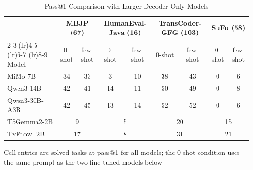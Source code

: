 \documentclass[manuscript,screen]{acmart}
\newcommand{\toolname}[1]{\textsc{#1}}
\newcommand{\mainname}{\toolname{TyFlow}\xspace}
\begin{document}
   \begin{table}[ht]
\centering
\begin{threeparttable}
\caption{{\color{revblue}Pass@1 Comparison with Larger Decoder-Only Models}}
\label{tab:decoder-only-compare}
\begin{tabular}{l cc cc cc cc}
\toprule
& \multicolumn{2}{c}{{\color{revblue}MBJP (67)}} & \multicolumn{2}{c}{{\color{revblue}HumanEval-Java (16)}} & \multicolumn{2}{c}{{\color{revblue}TransCoder-GFG (103)}} & \multicolumn{2}{c}{{\color{revblue}SuFu (58)}} \\
\cmidrule(lr){2-3} \cmidrule(lr){4-5} \cmidrule(lr){6-7} \cmidrule(lr){8-9}
{\color{revblue}Model }& {\color{revblue}0-shot }& {\color{revblue}few-shot }& {\color{revblue}0-shot }& {\color{revblue}few-shot }& {\color{revblue}0-shot }& {\color{revblue}few-shot }& {\color{revblue}0-shot }& {\color{revblue}few-shot }\\
\midrule
{\color{revblue}MiMo-7B             }& {\color{revblue}34 }& {\color{revblue}33 }& {\color{revblue}3  }& {\color{revblue}10 }& {\color{revblue}38 }& {\color{revblue}43 }& {\color{revblue}0 }& {\color{revblue}6 }\\
{\color{revblue}Qwen3-14B           }& {\color{revblue}42 }& {\color{revblue}41 }& {\color{revblue}14 }& {\color{revblue}11 }& {\color{revblue}50 }& {\color{revblue}49 }& {\color{revblue}0 }& {\color{revblue}8 }\\
{\color{revblue}Qwen3-30B-A3B       }& {\color{revblue}42 }& {\color{revblue}45 }& {\color{revblue}13 }& {\color{revblue}14 }& {\color{revblue}52 }& {\color{revblue}52 }& {\color{revblue}0 }& {\color{revblue}6 }\\
\midrule
{\color{revblue}T5Gemma2-2B   }& \multicolumn{2}{c}{{\color{revblue}9}}  & \multicolumn{2}{c}{{\color{revblue}5}}  & \multicolumn{2}{c}{{\color{revblue}20}} & \multicolumn{2}{c}{{\color{revblue}15}} \\
 \mainname %
 -2B      & \multicolumn{2}{c}{{\color{revblue}17}} & \multicolumn{2}{c}{{\color{revblue}8}}  & \multicolumn{2}{c}{{\color{revblue}31}} & \multicolumn{2}{c}{{\color{revblue}21}} \\
\bottomrule
\end{tabular}
\begin{tablenotes}
\footnotesize
\item {\color{revblue}Cell entries are solved tasks at pass@1 for all models; the 0-shot condition uses the same prompt as the two fine-tuned models below.
}\end{tablenotes}
\end{threeparttable}
\end{table}
 
\end{document}
